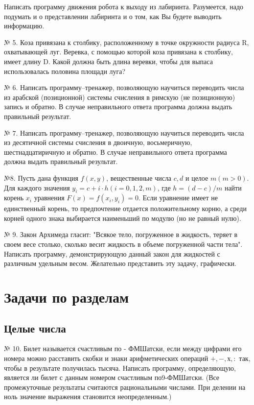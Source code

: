 Написать программу движения робота к выходу из лабиринта. Разумеется, надо подумать и о представлении лабиринта и о том, как Вы будете выводить информацию.


№ 5. Коза привязана к столбику, расположенному в точке окружности радиуса R, охватывающей луг. Веревка, с помощью которой коза привязана к столбику, имеет длину D. Какой должна быть длина веревки, чтобы для выпаса использовалась половина площади луга?

№ 6. Написать программу--тренажер, позволяющую научиться переводить числа из арабской (позиционной) системы счисления в римскую (не позиционную) запись и обратно. В случае неправильного ответа программа должна выдать правильный результат.

№ 7. Написать программу--тренажер, позволяющую научиться переводить числа из десятичной системы счисления в двоичную, восьмеричную, шестнадцатиричную и обратно. В случае неправильного ответа программа должна выдать правильный результат.

№8. Пусть дана функция $f(x,y)$, вещественные числа $c, d$ и целое $m (m>0)$. Для каждого значения $y_i = c + i\cdot h (i= 0,1,2, m)$, где $h = (d-c)/m$ найти корень $x_i$ уравнения $F(x) = f(x_i, y_i) = 0$. Если уравнение имеет не единственный корень, то предпочтение отдается положительному корню, а среди корней одного знака выбирается наименьший по модулю (но не равный нулю).

№ 9. Закон Архимеда гласит: "Всякое тело, погруженное в жидкость, теряет в своем весе столько, сколько весит жидкость в объеме погруженной части тела". Написать программу, демонстрирующую данный закон для жидкостей с различным удельным весом. Желательно представить эту задачу, графически.

\section{Задачи по разделам}

\subsection{Целые числа}

\hspace{7mm} № 10. Билет называется счастливым по - ФМШатски, если между цифрами его номера можно расставить скобки и знаки арифметических операций $+, -, х , :$ так, чтобы в результате получилась тысяча. Написать программу, определяющую, является ли билет с данным номером счастливым по9-ФМШатски. (Все промежуточные результаты считаются рациональными числами. При делении на ноль значение выражения становится неопределенным.)

